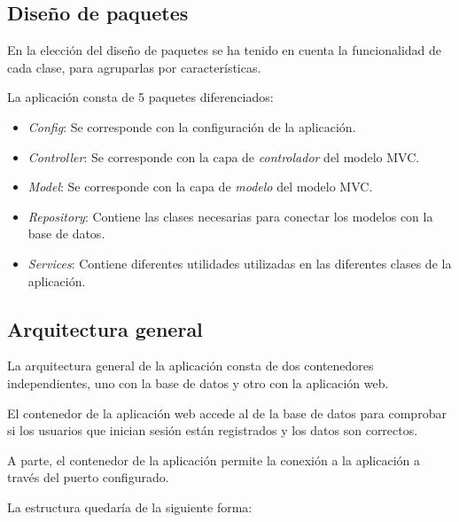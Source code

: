 \subsection{Diseño de paquetes}

En la elección del diseño de paquetes se ha tenido en cuenta la funcionalidad de cada clase, para agruparlas por características.

La aplicación consta de 5 paquetes diferenciados:

\begin{itemize}
	\item \textit{Config}: Se corresponde con la configuración de la aplicación.
	\item \textit{Controller}: Se corresponde con la capa de \textit{controlador} del modelo MVC.
	\item \textit{Model}: Se corresponde con la capa de \textit{modelo} del modelo MVC.
	\item \textit{Repository}: Contiene las clases necesarias para conectar los modelos con la base de datos.
	\item \textit{Services}: Contiene diferentes utilidades utilizadas en las diferentes clases de la aplicación.
\end{itemize}

\subsection{Arquitectura general}

La arquitectura general de la aplicación consta de dos contenedores independientes, uno con la base de datos y otro con la aplicación web.

El contenedor de la aplicación web accede al de la base de datos para comprobar si los usuarios que inician sesión están registrados y los datos son correctos.

A parte, el contenedor de la aplicación permite la conexión a la aplicación a través del puerto configurado.

La estructura quedaría de la siguiente forma:


